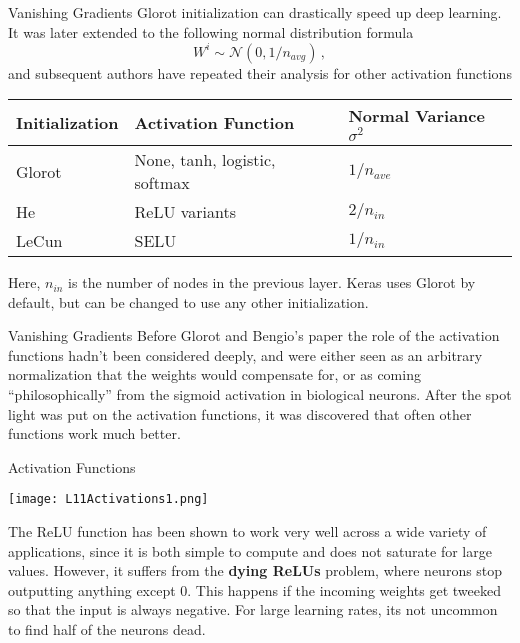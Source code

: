 \documentclass[10pt, table, dvipsnames,xcdraw,handout]{beamer}
\begin{document}
\begin{frame}[fragile]{Vanishing Gradients}
Glorot initialization can drastically speed up deep learning. It was later extended to the following normal distribution formula
$$
W^i \sim \mathcal{N}\left(0,1/ n_{avg}\right)\,,
$$
and subsequent authors have repeated their analysis for other activation functions

\begin{table}[]
\begin{tabular}{lll}
\multicolumn{1}{l|}{Initialization} & Activation Function           & Normal Variance $\sigma^2$ \\ \hline
\multicolumn{1}{l|}{Glorot}         & None, tanh, logistic, softmax & $1/n_{ave}$                \\
He                                  & ReLU variants                 & $2/n_{in}$                 \\
LeCun                               & SELU                          & $1/n_{in}$                
\end{tabular}
\end{table}

Here, $n_{in}$ is the number of nodes in the previous layer. Keras uses Glorot by default, but can be changed to use any other initialization.


\end{frame}




\begin{frame}[fragile]{Vanishing Gradients}
Before Glorot and Bengio's paper the role of the activation functions hadn't been considered deeply, and were either seen as an arbitrary normalization that the weights would compensate for, or as coming ``philosophically'' from the sigmoid activation in biological neurons. After the spot light was put on the activation functions, it was discovered that often other functions work much better.
\end{frame}


\begin{frame}[fragile]{Activation Functions}
  \begin{minipage}[t][0.5\textheight][t]{\textwidth}
	\centering \texttt{[image: L11Activations1.png]} 
  \end{minipage}
  \vfill
\begin{minipage}[t][0.5\textheight][t]{\textwidth}
The ReLU function has been shown to work very well across a wide variety of applications, since it is both simple to compute and does not saturate for large values. However, it suffers from the \textbf{dying ReLUs} problem, where neurons stop outputting anything except 0. This happens if the incoming weights get tweeked so that the input is always negative. For large learning rates, its not uncommon to find half of the neurons dead.
\end{minipage}
\end{frame}
\end{document}
